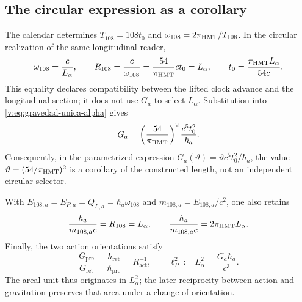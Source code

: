 \subsection{The circular expression as a corollary}

The calendar determines $T_{108}=108t_0$ and
$\omega_{108}=2\pi_{\mathrm{HMT}}/T_{108}$. In the circular realization of the
same longitudinal reader,
\begin{equation}
 \omega_{108}=\frac{c}{L_\alpha},\qquad
 R_{108}=\frac{c}{\omega_{108}}
 =\frac{54}{\pi_{\mathrm{HMT}}}ct_0=L_\alpha,
 \qquad
 t_0=\frac{\pi_{\mathrm{HMT}}L_\alpha}{54c}.
 \label{v:eq:compatibilidad-reloj-longitud}
\end{equation}
This equality declares compatibility between the lifted clock advance and
the longitudinal section; it does not use $G_a$ to select $L_\alpha$.
Substitution into \eqref{v:eq:gravedad-unica-alpha} gives
\begin{equation}
 G_a=\left(\frac{54}{\pi_{\mathrm{HMT}}}\right)^2
 \frac{c^5t_0^2}{\hbar_a}.
 \label{v:eq:gravedad-circular-corolario}
\end{equation}
Consequently, in the parametrized expression
$G_a(\vartheta)=\vartheta c^5t_0^2/\hbar_a$, the value
$\vartheta=(54/\pi_{\mathrm{HMT}})^2$ is a corollary of the constructed length,
not an independent circular selector.

With
$E_{108,a}=E_{P,a}=Q_{L,a}=\hbar_a\omega_{108}$ and
$m_{108,a}=E_{108,a}/c^2$, one also retains
\[
 \frac{\hbar_a}{m_{108,a}c}=R_{108}=L_\alpha,
 \qquad
 \frac{h_a}{m_{108,a}c}=2\pi_{\mathrm{HMT}}L_\alpha.
\]
Finally, the two action orientations satisfy
\begin{equation}
 \frac{G_{\mathrm{pre}}}{G_{\mathrm{ret}}}
 =\frac{\hbar_{\mathrm{ret}}}{\hbar_{\mathrm{pre}}}
 =R_{\mathrm{act}}^{-1},
 \qquad
 \ell_P^2:=L_\alpha^2
 =\frac{G_a\hbar_a}{c^3}.
 \label{v:eq:reciprocidad-gravedad-accion}
\end{equation}
The areal unit thus originates in $L_\alpha^2$; the later reciprocity
between action and gravitation preserves that area under a change of
orientation.
